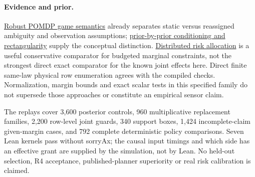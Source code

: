 \documentclass{article}
\begin{document}
\paragraph{Evidence and prior.}
\href{https://ijcai.org/proceedings/2024/740}{Robust POMDP game semantics} already separates static versus reassigned ambiguity and observation assumptions; \href{https://pages.stern.nyu.edu/~dbackus/Exotic/1Ambiguity/EpsteinSchneider%20priors%20JET%2003.pdf}{prior-by-prior conditioning and rectangularity} supply the conceptual distinction. \href{https://groups.csail.mit.edu/mers/papers/Ono-Williams_AAMAS10.pdf}{Distributed risk allocation} is a useful conservative comparator for budgeted marginal constraints, not the strongest direct exact comparator for the known joint effects here. Direct finite same-law physical row enumeration agrees with the compiled checks. Normalization, margin bounds and exact scalar tests in this specified family do not supersede those approaches or constitute an empirical sensor claim.

The replays cover 3,600 posterior controls, 960 multiplicative replacement families, 2,200 row-level joint guards, 340 support boxes, 1,424 incomplete-claim given-margin cases, and 792 complete deterministic policy comparisons. Seven Lean kernels pass without sorryAx; the causal input timings and which side has an effective grant are supplied by the simulation, not by Lean. No held-out selection, R4 acceptance, published-planner superiority or real risk calibration is claimed.
\end{document}
